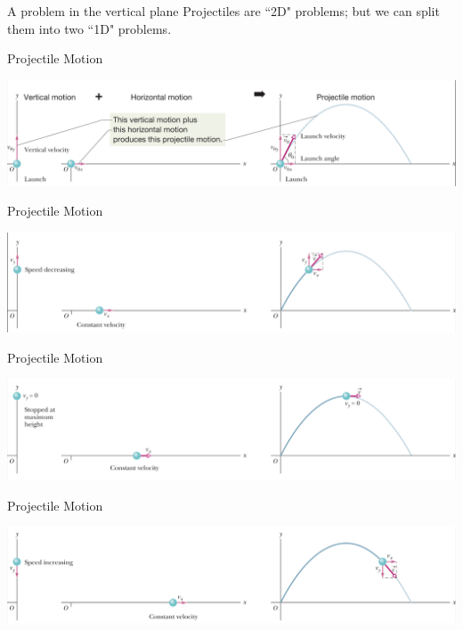 \begin{frame}{A problem in the vertical plane}
Projectiles are ``2D" problems; but we can split them into two ``1D" problems.\\[22ex]

\end{frame}



\begin{frame}{Projectile Motion}

\includegraphics[scale=0.32]{proj1}

\end{frame}

\begin{frame}{Projectile Motion}

\includegraphics[scale=0.32]{proj2}

\end{frame}

\begin{frame}{Projectile Motion}

\includegraphics[scale=0.32]{proj3}

\end{frame}

\begin{frame}{Projectile Motion}

\includegraphics[scale=0.32]{proj4}

\end{frame}

